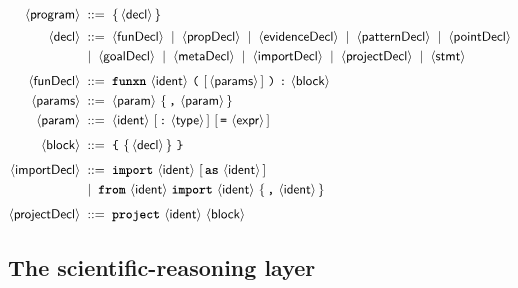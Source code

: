 \documentclass[11pt,a4paper]{article}
\theoremstyle{plain}
\theoremstyle{definition}
\theoremstyle{remark}
\newcommand{\nt}[1]{\ensuremath{\langle\textsf{#1}\rangle}}  %
\newcommand{\tm}[1]{\textbf{\texttt{#1}}}                 %
\newcommand{\opt}[1]{\ensuremath{[\,#1\,]}}               %
\newcommand{\rep}[1]{\ensuremath{\{\,#1\,\}}}             %
\newcommand{\bnfeq}{\;::=\;}
\newcommand{\bnfor}{\;\mid\;}
\begin{document}
\begin{align*}
\nt{program} &\bnfeq \rep{\nt{decl}}\\[2pt]
\nt{decl}    &\bnfeq \nt{funDecl} \bnfor \nt{propDecl} \bnfor \nt{evidenceDecl}
                     \bnfor \nt{patternDecl} \bnfor \nt{pointDecl}\\
             &\bnfor \nt{goalDecl} \bnfor \nt{metaDecl} \bnfor \nt{importDecl}
                     \bnfor \nt{projectDecl} \bnfor \nt{stmt}\\[4pt]
\nt{funDecl} &\bnfeq \tm{funxn}\ \nt{ident}\
                     \texttt{(}\ \opt{\nt{params}}\ \texttt{)}\ \texttt{:}\
                     \nt{block}\\
\nt{params}  &\bnfeq \nt{param}\ \rep{\texttt{,}\ \nt{param}}\\
\nt{param}   &\bnfeq \nt{ident}\ \opt{\texttt{:}\ \nt{type}}\
                     \opt{\texttt{=}\ \nt{expr}}\\[4pt]
\nt{block}   &\bnfeq \texttt{\{}\ \rep{\nt{decl}}\ \texttt{\}}\\[4pt]
\nt{importDecl}&\bnfeq \tm{import}\ \nt{ident}\ \opt{\tm{as}\ \nt{ident}}\\
             &\bnfor \tm{from}\ \nt{ident}\ \tm{import}\
                     \nt{ident}\ \rep{\texttt{,}\ \nt{ident}}\\[4pt]
\nt{projectDecl}&\bnfeq \tm{project}\ \nt{ident}\ \nt{block}
\end{align*}

\subsection{The scientific-reasoning layer}
\end{document}
